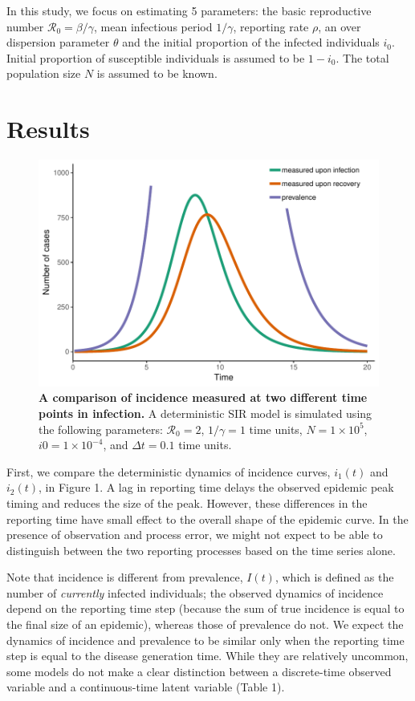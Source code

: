 \documentclass[12pt]{article}\usepackage[]{graphicx}\usepackage[]{color}
\begin{document}
In this study, we focus on estimating 5 parameters: the basic reproductive
number $\mathcal R_0 = \beta/\gamma$, mean infectious period $1/\gamma$, 
reporting rate $\rho$, an over dispersion parameter $\theta$ and the initial
proportion of the infected individuals $i_0$. Initial proportion of
susceptible individuals is assumed to be $1 - i_0$. The total population
size $N$ is assumed to be known.

\section{Results}

\begin{figure}[!t]
\includegraphics[width=\textwidth]{../figure/example.pdf}
\caption{
\textbf{A comparison of incidence measured at two different time points in infection.}
A deterministic SIR model is simulated using the following parameters: 
$\mathcal R_0 = 2$, $1/\gamma = 1$ time units, $N = 1 \times 10^5$, $i0 = 1 \times 10^{-4}$,
and $\Delta t = 0.1$ time units.
}
\end{figure}

First, we compare the deterministic dynamics of incidence curves,
$i_1(t)$ and $i_2(t)$, in Figure 1. A lag in reporting time delays
the observed epidemic peak timing and reduces the size of the peak. However, 
these differences in the reporting time have small effect to the overall shape 
of the epidemic curve. In the presence of observation and process error, we 
might not expect to be able to distinguish between the two reporting processes
based on the time series alone. 

Note that incidence is different from prevalence,
$I(t)$, which is defined as the number of \emph{currently} infected individuals;
the observed dynamics of incidence depend on the reporting time step (because the sum of 
true incidence is equal to the final size of an epidemic), whereas those of
prevalence do not. We expect the dynamics of incidence and prevalence to be similar only when
the reporting time step is equal to the disease generation time. While they are relatively
uncommon, some models do not make a clear distinction between a discrete-time observed 
variable and a continuous-time latent variable (Table 1).
\end{document}
